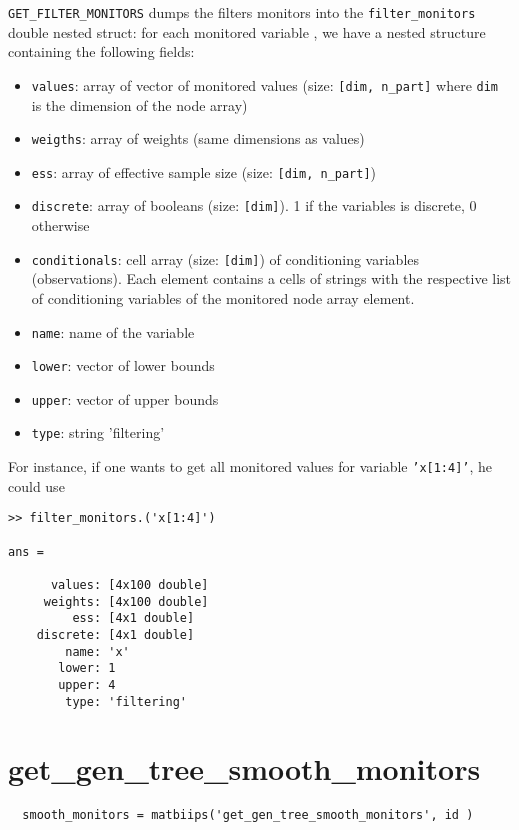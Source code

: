 \documentclass[11pt,twoside]{article}
\begin{document}
 \texttt{GET\_FILTER\_MONITORS} dumps the filters monitors into the \texttt{filter\_monitors} double nested struct: for each monitored variable , we have
  a nested structure containing the following fields:
  \begin{itemize}
   \item \texttt{values}: array of vector of monitored values (size: \texttt{[dim, n\_part]} where \texttt{dim} is the dimension of the node array)
   \item \texttt{weigths}: array of weights (same dimensions as values)
   \item \texttt{ess}: array of effective  sample size (size: \texttt{[dim, n\_part]})
   \item \texttt{discrete}: array of booleans (size: \texttt{[dim]}). 1 if the variables is discrete, 0 otherwise
   \item \texttt{conditionals}: cell array (size: \texttt{[dim]}) of conditioning variables (observations). Each element contains a cells of strings with the respective list of conditioning variables of  the monitored node array element.
   \item \texttt{name}: name of the variable
   \item \texttt{lower}: vector of lower bounds
   \item \texttt{upper}: vector of upper bounds
   \item \texttt{type}: string 'filtering'
   \end{itemize}

  For instance, if one wants to get all monitored values for variable \texttt{'x[1:4]'}, he could use
 \begin{lstlisting}
>> filter_monitors.('x[1:4]')

ans =

      values: [4x100 double]
     weights: [4x100 double]
         ess: [4x1 double]
    discrete: [4x1 double]
        name: 'x'
       lower: 1
       upper: 4
        type: 'filtering'

 \end{lstlisting}

 \section{get\_gen\_tree\_smooth\_monitors}

 \begin{lstlisting}
  smooth_monitors = matbiips('get_gen_tree_smooth_monitors', id )
 \end{lstlisting}
\end{document}
